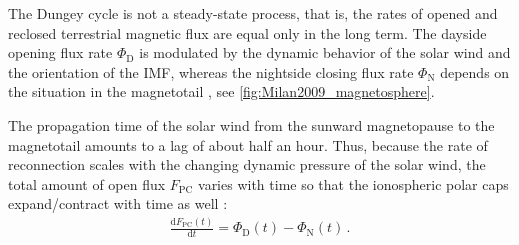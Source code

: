 The Dungey cycle is not a steady-state process, that is, the rates of opened and reclosed terrestrial magnetic flux are equal only in the long term. The dayside opening flux rate $\Phi_\text{D}$ is modulated by the dynamic behavior of the solar wind and the orientation of the IMF, whereas the nightside closing flux rate $\Phi_\text{N}$ depends on the situation in the magnetotail \citep{Milan2007}, see \autoref{fig:Milan2009_magnetosphere}.
\begin{figure}[htb]
\end{figure}
The propagation time of the solar wind from the sunward magnetopause to the magnetotail amounts to a lag of about half an hour. Thus, because the rate of reconnection scales with the changing dynamic pressure of the solar wind, the total amount of open flux $F_\text{PC}$ varies with time so that the ionospheric polar caps expand/contract with time as well \citep{Siscoe1985}:
\begin{align}
	\frac{\text{d}F_\text{PC}(t)}{\text{d}t} = \Phi_\text{D}(t) - \Phi_\text{N}(t)	\,.	\label{eq:faradays_law}
\end{align}

